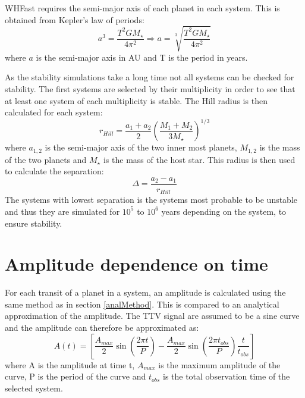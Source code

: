 \documentclass[12pt]{report}
\begin{document}
	WHFast requires the semi-major axis of each planet in each system. This is obtained from Kepler's law of periods:
	\begin{equation}
		a^3 = \frac{T^2 G M_{\star}}{4\pi^2} \Rightarrow a = \sqrt[3]{\frac{T^2 G M_{\star}}{4\pi^2}}
	\end{equation}
		where $a$ is the semi-major axis in AU and T is the period in years. 
		
	As the stability simulations take a long time not all systems can be checked for stability. The first systems are selected by their multiplicity in order to see that at least one system of each multiplicity is stable. The Hill radius is then calculated for each system:
	\begin{equation}
		r_{Hill} = \frac{a_1 + a_2}{2}\left(\frac{M_1 + M_2}{3M_{\star}}\right)^{1/3}
	\end{equation}
	where $a_{1,2}$ is the semi-major axis of the two inner most planets, $M_{1,2}$ is the mass of the two planets and $M_{\star}$ is the mass of the host star. This radius is then used to calculate the separation:
	\begin{equation}
		\Delta = \frac{a_2 - a_1}{r_{Hill}}
	\end{equation}
	The systems with lowest separation is the systems most probable to be unstable \citep{1996Icar..119..261C} and thus they are simulated for $10^5$ to $10^6$ years depending on the system, to ensure stability. 
	
\section{Amplitude dependence on time}
	For each transit of a planet in a system, an amplitude is calculated using the same method as in section \ref{analMethod}. This is compared to an analytical approximation of the amplitude. The TTV signal are assumed to be a sine curve and the amplitude can therefore be approximated as:
	\begin{equation}
		A(t) = \left[\frac{A_{max}}{2}\sin\left(\frac{2 \pi t}{P}\right) - \frac{A_{max}}{2}\sin\left(\frac{2 \pi t_{obs}}{P}\right)\frac{t}{t_{obs}}\right]
	\end{equation}
	where A is the amplitude at time t, $A_{max}$ is the maximum amplitude of the curve, P is the period of the curve and $t_{obs}$ is the total observation time of the selected system.
\end{document}
